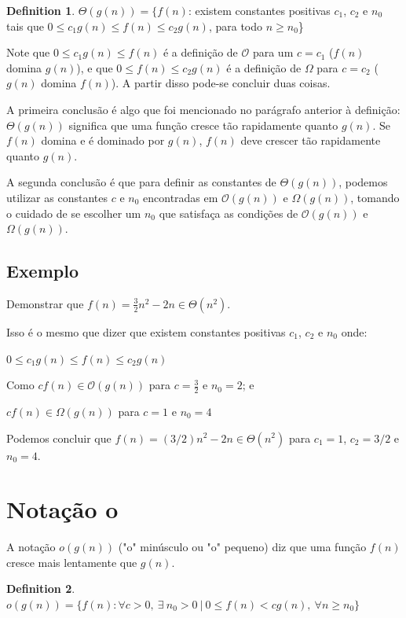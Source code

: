 \documentclass[ a4paper, twocolumn]{article}
\theoremstyle{definition}
\newtheorem{definition}{Definition}[section]
\begin{document}
\begin{definition}
	$\Theta(g(n)) = \{f(n)$: existem constantes positivas $c_1$, $c_2$ e $n_0$ tais que $0 \leq c_1g(n) \leq f(n) \leq c_2g(n)$, para todo $n \geq n_0$\}
\end{definition}

Note que $0 \leq c_1g(n) \leq f(n)$ é a definição de $\mathcal{O}$ para um $c = c_1$ ($f(n)$ domina $g(n)$), e que $0 \leq f(n) \leq c_2g(n)$ é a definição de $\Omega$ para $c = c_2$ ($g(n)$ domina $f(n)$). A partir disso pode-se concluir duas coisas. 

A primeira conclusão é algo que foi mencionado no parágrafo anterior à definição: $\Theta(g(n))$ significa que uma função cresce tão rapidamente quanto $g(n)$. Se $f(n)$ domina e é dominado por $g(n)$, $f(n)$ deve crescer tão rapidamente quanto $g(n)$.

A segunda conclusão é que para definir as constantes de $\Theta(g(n))$, podemos utilizar as constantes $c$ e $n_0$ encontradas em $\mathcal{O}(g(n))$ e $\Omega(g(n))$, tomando o cuidado de se escolher um $n_0$ que satisfaça as condições de $\mathcal{O}(g(n))$ e $\Omega(g(n))$.

\subsection{Exemplo}
Demonstrar que $f(n) = \frac{3}{2}n^2 - 2n \in \Theta(n^2)$. 

Isso é o mesmo que dizer que existem constantes positivas $c_1$, $c_2$ e $n_0$ onde: 

$0 \leq c_1g(n) \leq f(n) \leq c_2g(n)$

Como $cf(n) \in \mathcal{O}(g(n)) $ para $c = \frac{3}{2}$ e $n_0 = 2$; e

$cf(n) \in \Omega(g(n))$ para $c = 1$ e $n_0 = 4$

Podemos concluir que $f(n) = (3/2)n^2 - 2n \in \Theta(n^2)$ para $c_1 = 1$, $c_2 = 3/2$ e $n_0 = 4$.

\section{Notação o}
A notação $o(g(n))$ ("o" minúsculo ou "o" pequeno)  diz que uma função $f(n)$ cresce mais lentamente que $g(n)$.

\begin{definition}
	$o(g(n)) = \{f(n): \forall c>0, \ \exists \ n_0 > 0 \ | \ 0 \leq f(n) < cg(n), \ \forall n \geq n_0 \}$
\end{definition} 
\end{document}
